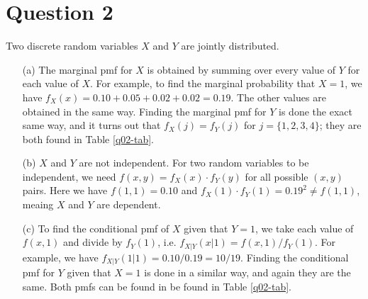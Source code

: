 \documentclass[10pt]{article}
\begin{document}
\section{Question 2} \noindent
Two discrete random variables \(X\) and \(Y\) are jointly distributed. 
\begin{itemize}
    \item[(a)] The marginal pmf for \(X\) is obtained by summing over every value of \(Y\) for each value of \(X\).
    For example, to find the marginal probability that \(X=1\), we have \(f_X(x) = 0.10 + 0.05 + 0.02 + 0.02 = 0.19\). 
    The other values are obtained in the same way. Finding the marginal pmf for \(Y\) is done the exact same way, and 
    it turns out that \(f_X(j) = f_Y(j)\) for \(j = \{1,2,3,4\}\); they are both found in Table \ref{q02-tab}.
    \item[(b)] \(X\) and \(Y\) are not independent. For two random variables to be independent, we need \(f(x,y) = f_X(x)\cdot f_Y(y)\)
    for all possible \((x,y)\) pairs. Here we have \(f(1,1) = 0.10\) and \(f_X(1)\cdot f_Y(1) = 0.19^2 \neq f(1,1)\), meaing 
    \(X\) and \(Y\) are dependent. 
    \item[(c)] To find the conditional pmf of \(X\) given that \(Y=1\), we take each value of \(f(x,1)\) and divide by \(f_Y(1)\), 
    i.e. \(f_{X|Y}(x|1) = f(x,1) / f_Y(1)\). For example, we have \(f_{X|Y}(1|1) = 0.10 / 0.19 = 10/19\). Finding the conditional pmf for 
    \(Y\) given that \(X = 1\) is done in a similar way, and again they are the same. 
    Both pmfs can be found in be found in Table \ref{q02-tab}.
\end{itemize}
\end{document}
